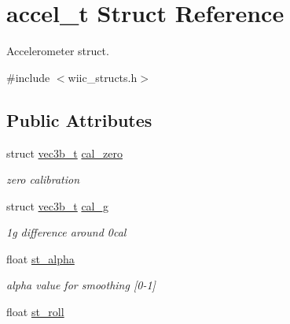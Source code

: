 \hypertarget{structaccel__t}{\section{accel\-\_\-t Struct Reference}
\label{structaccel__t}
}


Accelerometer struct.  




{\ttfamily \#include $<$wiic\-\_\-structs.\-h$>$}

\subsection*{Public Attributes}
\begin{DoxyCompactItemize}
\item 
\hypertarget{structaccel__t_aebbccd4f86055e4265579a425ea0cec7}{struct \hyperlink{structvec3b__t}{vec3b\-\_\-t} \hyperlink{structaccel__t_aebbccd4f86055e4265579a425ea0cec7}{cal\-\_\-zero}}\label{structaccel__t_aebbccd4f86055e4265579a425ea0cec7}

\begin{DoxyCompactList}\small\item\em zero calibration \end{DoxyCompactList}\item 
\hypertarget{structaccel__t_ac1d5d7814dcaf180e02f6180967d4afc}{struct \hyperlink{structvec3b__t}{vec3b\-\_\-t} \hyperlink{structaccel__t_ac1d5d7814dcaf180e02f6180967d4afc}{cal\-\_\-g}}\label{structaccel__t_ac1d5d7814dcaf180e02f6180967d4afc}

\begin{DoxyCompactList}\small\item\em 1g difference around 0cal \end{DoxyCompactList}\item 
\hypertarget{structaccel__t_a6aa36a40f82af45cb67f8db9ff8b41ca}{float \hyperlink{structaccel__t_a6aa36a40f82af45cb67f8db9ff8b41ca}{st\-\_\-alpha}}\label{structaccel__t_a6aa36a40f82af45cb67f8db9ff8b41ca}

\begin{DoxyCompactList}\small\item\em alpha value for smoothing \mbox{[}0-\/1\mbox{]} \end{DoxyCompactList}\item 
\hypertarget{structaccel__t_a94ac67da0404fc3ddc6f7d4a6791159e}{float \hyperlink{structaccel__t_a94ac67da0404fc3ddc6f7d4a6791159e}{st\-\_\-roll}}\label{structaccel__t_a94ac67da0404fc3ddc6f7d4a6791159e}


\end{DoxyCompactItemize}
